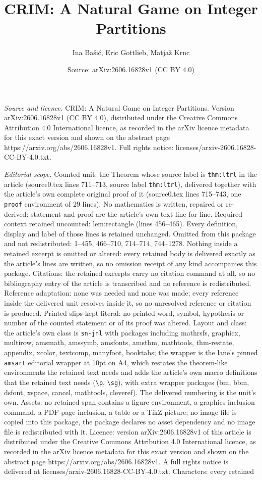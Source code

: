 \documentclass[10pt,a4paper]{amsart}
\title[CRIM: A Natural Game on Integer Partitions]{CRIM: A Natural Game on Integer Partitions}
\author{Ina Ba\v{s}i\'c, Eric Gottlieb, Matja\v{z} Krnc}
\date{Source: arXiv:2606.16828v1 (CC BY 4.0)}
\begin{document}
\maketitle

\noindent\emph{Source and licence.} CRIM: A Natural Game on Integer Partitions. Version arXiv:2606.16828v1 (CC BY 4.0), distributed under the Creative Commons Attribution 4.0 International licence, as recorded in the arXiv licence metadata for this exact version and shown on the abstract page https://arxiv.org/abs/2606.16828v1. Full rights notice: licenses/arxiv-2606.16828-CC-BY-4.0.txt.\par\smallskip

\noindent\textit{Editorial scope.} Counted unit: the Theorem whose source label is \texttt{thm:ltrl} in the article (source0.tex lines 711--713, source label \texttt{thm:ltrl}), delivered together with the article's own complete original proof of it (source0.tex lines 715--743, one \texttt{proof} environment of 29 lines). No mathematics is written, repaired or re-derived: statement and proof are the article's own text line for line. Required context retained uncounted: lem:rectangle (lines 456--465). Every definition, display and label of those lines is retained unchanged. Omitted from this package and not redistributed: 1--455, 466--710, 714--714, 744--1278. Nothing inside a retained excerpt is omitted or altered: every retained body is delivered exactly as the article's lines are written, so no omission receipt of any kind accompanies this package. Citations: the retained excerpts carry no citation command at all, so no bibliography entry of the article is transcribed and no reference is redistributed. Reference adaptation: none was needed and none was made; every reference inside the delivered unit resolves inside it, so no unresolved reference or citation is produced. Printed slips kept literal: no printed word, symbol, hypothesis or number of the counted statement or of its proof was altered. Layout and class: the article's own class is \texttt{sn-jnl} with packages including mathrsfs, graphicx, multirow, amsmath, amssymb, amsfonts, amsthm, mathtools, thm-restate, appendix, xcolor, textcomp, manyfoot, booktabs; the wrapper is the lane's pinned \texttt{amsart} editorial wrapper at 10pt on A4, which restates the theorem-like environments the retained text needs and adds the article's own macro definitions that the retained text needs (\texttt{\textbackslash p}, \texttt{\textbackslash sg}), with extra wrapper packages (bm, bbm, dsfont, xspace, cancel, mathtools, cleveref). The delivered numbering is the unit's own. Assets: no retained span contains a figure environment, a graphics-inclusion command, a PDF-page inclusion, a table or a TikZ picture; no image file is copied into this package, the package declares no asset dependency and no image file is redistributed with it. Licence: version arXiv:2606.16828v1 of this article is distributed under the Creative Commons Attribution 4.0 International licence, as recorded in the arXiv licence metadata for this exact version and shown on the abstract page https://arxiv.org/abs/2606.16828v1. A full rights notice is delivered at licenses/arxiv-2606.16828-CC-BY-4.0.txt. Characters: every retained 
\end{document}
